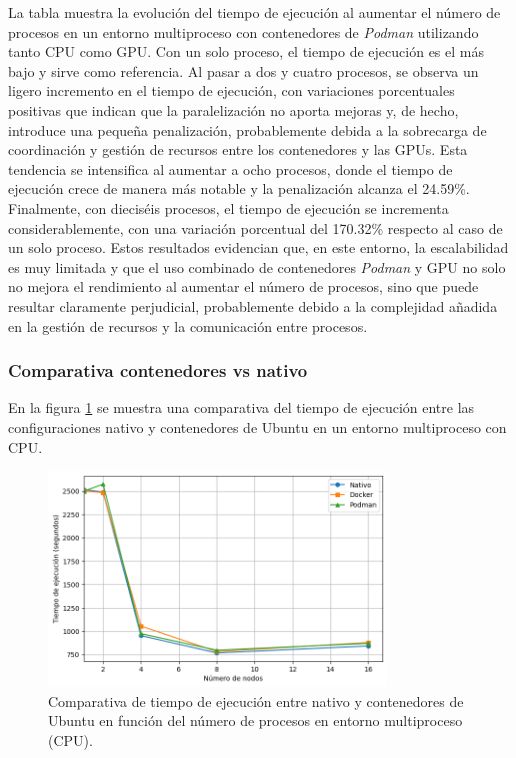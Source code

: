 La tabla muestra la evolución del tiempo de ejecución al aumentar el número de procesos en un entorno multiproceso con contenedores de \textit{Podman} utilizando tanto CPU como GPU. Con un solo proceso, el tiempo de ejecución es el más bajo y sirve como referencia. Al pasar a dos y cuatro procesos, se observa un ligero incremento en el tiempo de ejecución, con variaciones porcentuales positivas que indican que la paralelización no aporta mejoras y, de hecho, introduce una pequeña penalización, probablemente debida a la sobrecarga de coordinación y gestión de recursos entre los contenedores y las GPUs. Esta tendencia se intensifica al aumentar a ocho procesos, donde el tiempo de ejecución crece de manera más notable y la penalización alcanza el 24.59\%. Finalmente, con dieciséis procesos, el tiempo de ejecución se incrementa considerablemente, con una variación porcentual del 170.32\% respecto al caso de un solo proceso. Estos resultados evidencian que, en este entorno, la escalabilidad es muy limitada y que el uso combinado de contenedores \textit{Podman} y GPU no solo no mejora el rendimiento al aumentar el número de procesos, sino que puede resultar claramente perjudicial, probablemente debido a la complejidad añadida en la gestión de recursos y la comunicación entre procesos.

\subsubsection{Comparativa contenedores vs nativo}

En la figura \ref{fig:multi-node_ubuntu_container_vs_native_time} se muestra una comparativa del tiempo de ejecución entre las configuraciones nativo y contenedores de Ubuntu en un entorno multiproceso con CPU.

\begin{figure}[ht]
    \centering
    \includegraphics[width=0.8\textwidth]{imagenes/cap5/multi-node_ubuntu_container_vs_native_time.png}
    \caption{Comparativa de tiempo de ejecución entre nativo y contenedores de Ubuntu en función del número de procesos en entorno multiproceso (CPU).}
    \label{fig:multi-node_ubuntu_container_vs_native_time}
\end{figure}

